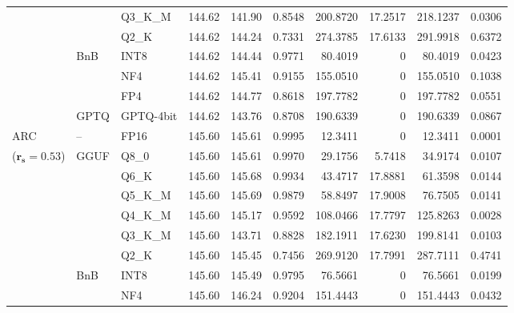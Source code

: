 \begin{longtable}{ll l rrrrrrr}
 &  & Q3\_K\_M & 144.62 & 141.90 & \cellcolor{red!18} 0.8548 & \cellcolor{red!18} 200.8720 & 17.2517 & \cellcolor{red!18} 218.1237 & \cellcolor{red!18} 0.0306 \\
 &  & Q2\_K & 144.62 & 144.24 & \cellcolor{red!35} 0.7331 & \cellcolor{red!35} 274.3785 & 17.6133 & \cellcolor{red!35} 291.9918 & \cellcolor{red!35} 0.6372 \\
 & BnB & INT8 & 144.62 & 144.44 & 0.9771 & 80.4019 & \cellcolor{cyan!12} $0$ & 80.4019 & 0.0423 \\
 &  & NF4 & 144.62 & 145.41 & \cellcolor{red!18} 0.9155 & \cellcolor{red!18} 155.0510 & \cellcolor{cyan!12} $0$ & \cellcolor{red!18} 155.0510 & \cellcolor{red!18} 0.1038 \\
 &  & FP4 & 144.62 & 144.77 & \cellcolor{red!18} 0.8618 & \cellcolor{red!18} 197.7782 & \cellcolor{cyan!12} $0$ & \cellcolor{red!18} 197.7782 & \cellcolor{red!18} 0.0551 \\
 & GPTQ & GPTQ-4bit & 144.62 & 143.76 & \cellcolor{red!18} 0.8708 & \cellcolor{red!18} 190.6339 & \cellcolor{cyan!12} $0$ & \cellcolor{red!18} 190.6339 & \cellcolor{red!18} 0.0867 \\
\midrule
ARC & -- & FP16 & 145.60 & 145.61 & 0.9995 & 12.3411 & \cellcolor{cyan!12} $0$ & 12.3411 & 0.0001 \\
{\small ($\mathbf{r_s{=}0.53}$)} & GGUF & Q8\_0 & 145.60 & 145.61 & 0.9970 & 29.1756 & 5.7418 & 34.9174 & 0.0107 \\
 &  & Q6\_K & 145.60 & 145.68 & 0.9934 & 43.4717 & 17.8881 & 61.3598 & 0.0144 \\
 &  & Q5\_K\_M & 145.60 & 145.69 & 0.9879 & 58.8497 & 17.9008 & 76.7505 & 0.0141 \\
 &  & Q4\_K\_M & 145.60 & 145.17 & 0.9592 & 108.0466 & 17.7797 & 125.8263 & 0.0028 \\
 &  & Q3\_K\_M & 145.60 & 143.71 & \cellcolor{red!18} 0.8828 & \cellcolor{red!18} 182.1911 & 17.6230 & \cellcolor{red!18} 199.8141 & \cellcolor{red!18} 0.0103 \\
 &  & Q2\_K & 145.60 & 145.45 & \cellcolor{red!35} 0.7456 & \cellcolor{red!35} 269.9120 & 17.7991 & \cellcolor{red!35} 287.7111 & \cellcolor{red!35} 0.4741 \\
 & BnB & INT8 & 145.60 & 145.49 & 0.9795 & 76.5661 & \cellcolor{cyan!12} $0$ & 76.5661 & 0.0199 \\
 &  & NF4 & 145.60 & 146.24 & \cellcolor{red!18} 0.9204 & \cellcolor{red!18} 151.4443 & \cellcolor{cyan!12} $0$ & \cellcolor{red!18} 151.4443 & \cellcolor{red!18} 0.0432 \\

\end{longtable}
